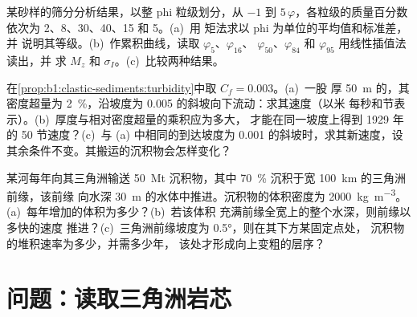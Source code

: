 \begin{exercise}[$\star\star\star$]\label{exo:b1:clastic-sediments:10}
某砂样的筛分分析结果，以整 phi 粒级划分，从 $-1$ 到
$5\,\varphi$，各粒级的质量百分数依次为 2、8、30、40、15 和 5。(a)~用
矩法求以 phi 为单位的平均值和标准差，并
说明其等级。(b)~作累积曲线，读取 $\varphi_5$、$\varphi_{16}$、
$\varphi_{50}$、$\varphi_{84}$ 和 $\varphi_{95}$ 用线性插值法读出，并
求 $M_z$ 和 $\sigma_I$。(c)~比较两种结果。
\end{exercise}

\begin{exercise}[$\star\star\star$]\label{exo:b1:clastic-sediments:11}
在\cref{prop:b1:clastic-sediments:turbidity}中取 $C_f = 0.003$。(a)~一股
厚 \qty{50}{m} 的，其密度超量为
\qty{2}{\percent}，沿坡度为 \num{0.005} 的斜坡向下流动：求其速度（以米
每秒和节表示）。(b)~厚度与相对密度超量的乘积应为多大，
才能在同一坡度上得到 1929 年的 50 节速度？(c)~与
(a) 中相同的到达坡度为 \num{0.001} 的斜坡时，求其新速度，设
其余条件不变。其搬运的沉积物会怎样变化？
\end{exercise}

\begin{exercise}[$\star\star\star$]\label{exo:b1:clastic-sediments:12}
某河每年向其三角洲输送 \qty{50}{Mt} 沉积物，其中
\qty{70}{\percent} 沉积于宽 \qty{100}{km} 的三角洲前缘，该前缘
向水深 \qty{30}{m} 的水体中推进。沉积物的体积密度为
\qty{2000}{kg.m^{-3}}。(a)~每年增加的体积为多少？(b)~若该体积
充满前缘全宽上的整个水深，则前缘以多快的速度
推进？(c)~三角洲前缘坡度为 \ang{0.5}，则在其下方某固定点处，
沉积物的堆积速率为多少，并需多少年，
该处才形成向上变粗的层序？
\end{exercise}

\section{问题：读取三角洲岩芯}

